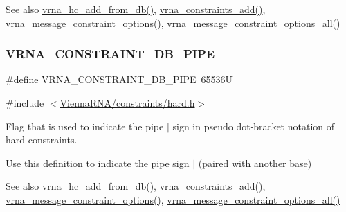 \begin{DoxySeeAlso}{See also}
\mbox{\hyperlink{group__hard__constraints_ga5b4de3247b67358080c176b94591a8e6}{vrna\+\_\+hc\+\_\+add\+\_\+from\+\_\+db()}}, \mbox{\hyperlink{group__constraints_ga35a401f680969a556858a8dd5f1d07cc}{vrna\+\_\+constraints\+\_\+add()}}, \mbox{\hyperlink{group__constraints_gaa1f20b53bf09ac2e6b0dbb13f7d89670}{vrna\+\_\+message\+\_\+constraint\+\_\+options()}}, \mbox{\hyperlink{group__constraints_gaec7e13fa0465c2acc7a621d1aecb709f}{vrna\+\_\+message\+\_\+constraint\+\_\+options\+\_\+all()}} 
\end{DoxySeeAlso}
\mbox{\label{group__hard__constraints_ga13053547a2de5532b64b64d35e097ae1}} 
\subsubsection{\texorpdfstring{VRNA\_CONSTRAINT\_DB\_PIPE}{VRNA\_CONSTRAINT\_DB\_PIPE}}
{\footnotesize\ttfamily \#define V\+R\+N\+A\+\_\+\+C\+O\+N\+S\+T\+R\+A\+I\+N\+T\+\_\+\+D\+B\+\_\+\+P\+I\+PE~65536U}



{\ttfamily \#include $<$\mbox{\hyperlink{hard_8h}{Vienna\+R\+N\+A/constraints/hard.\+h}}$>$}



Flag that is used to indicate the pipe \textquotesingle{}$\vert$\textquotesingle{} sign in pseudo dot-\/bracket notation of hard constraints. 

Use this definition to indicate the pipe sign \textquotesingle{}$\vert$\textquotesingle{} (paired with another base)

\begin{DoxySeeAlso}{See also}
\mbox{\hyperlink{group__hard__constraints_ga5b4de3247b67358080c176b94591a8e6}{vrna\+\_\+hc\+\_\+add\+\_\+from\+\_\+db()}}, \mbox{\hyperlink{group__constraints_ga35a401f680969a556858a8dd5f1d07cc}{vrna\+\_\+constraints\+\_\+add()}}, \mbox{\hyperlink{group__constraints_gaa1f20b53bf09ac2e6b0dbb13f7d89670}{vrna\+\_\+message\+\_\+constraint\+\_\+options()}}, \mbox{\hyperlink{group__constraints_gaec7e13fa0465c2acc7a621d1aecb709f}{vrna\+\_\+message\+\_\+constraint\+\_\+options\+\_\+all()}} 
\end{DoxySeeAlso}
\mbox{\label{group__hard__constraints_ga369bea82eae75fbe626f409fa425747e}} 
